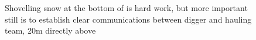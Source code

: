 \begin{figure}[b!]
\checkoddpage \ifoddpage \forcerectofloat \else \forceversofloat \fi
\centering
{}
\caption{Shovelling snow at the bottom of \protect{} is hard work, but more important still is to establish clear communications between digger and hauling team, 20m directly above }
\label{bottom of M10}
\end{figure}

